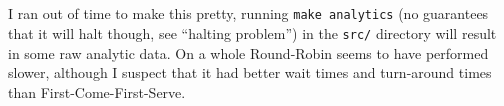 \documentclass[11pt, letterpaper]{article}
\newcommand{\code}[1]{\colorbox{codebg}{\textcolor{codefg}{\texttt{#1}}}}
\begin{document}
\\
\\
\noindent{\today}\\
\\

\bigskip
{}

I ran out of time to make this pretty, running \code{make analytics} (no guarantees that it will halt though, see ``halting problem'') in the \code{src/} directory will result in some raw analytic data. On a whole Round-Robin seems to have performed slower, although I suspect that it had better wait times and turn-around times than First-Come-First-Serve.
\end{document}
